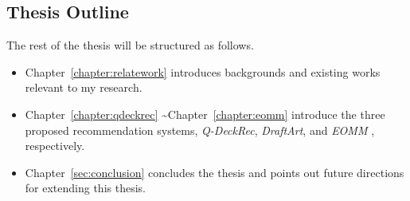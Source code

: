 \subsection{Thesis Outline}
The rest of the thesis will be structured as follows. 
\begin{itemize}
\item Chapter~\ref{chapter:relatework} introduces backgrounds and existing works relevant to my research. 
\item Chapter~\ref{chapter:qdeckrec} \textasciitilde  Chapter~\ref{chapter:eomm} introduce the three proposed recommendation systems, \textit{Q-DeckRec}, \textit{DraftArt}, and \textit{EOMM} , respectively.
\item Chapter~\ref{sec:conclusion} concludes the thesis and points out future directions for extending this thesis.
\end{itemize}

